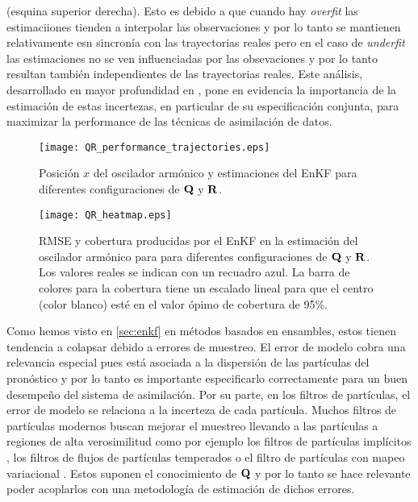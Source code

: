 (esquina superior derecha). Esto es debido a que cuando hay \textit{overfit} las estimaciiones tienden a interpolar las observaciones y por lo tanto se mantienen relativamente esn sincronía con las trayectorias reales pero en el caso de \textit{underfit} las estimaciones no se ven influenciadas por las obsevaciones y por lo tanto resultan también independientes de las trayectorias reales. Este análisis, desarrollado en mayor profundidad en \cite{Tandeo2020}, pone en evidencia la importancia de la estimación de estas incertezas, en particular de su especificación conjunta, para maximizar la performance de las técnicas de asimilación de datos.

\begin{figure}[h]
    \centering
    \texttt{[image: QR\_performance\_trajectories.eps]}
    \caption{Posición $x$ del oscilador armónico y estimaciones del EnKF para diferentes configuraciones de $\mathbf{Q}$ y $\mathbf{R}$.}
    \label{fig:QR_performance_trajectories}
\end{figure}

\begin{figure}[h]
    \centering
    \texttt{[image: QR\_heatmap.eps]}
    \caption{RMSE y cobertura producidas por el EnKF en la estimación del oscilador armónico para para diferentes configuraciones de $\mathbf{Q}$ y $\mathbf{R}$. Los valores reales se indican con un recuadro azul. La barra de colores para la cobertura tiene un escalado lineal para que el centro (color blanco) esté en el valor ópimo de cobertura de 95\%.}
    \label{fig:QR_heatmap}
\end{figure}

Como hemos visto en \ref{sec:enkf} en métodos basados en ensambles, estos tienen tendencia a colapsar debido a errores de muestreo. El error de modelo cobra una relevancia especial pues está asociada a la dispersión de las partículas del pronóstico y por lo tanto es importante especificarlo correctamente para un buen desempeño del sistema de asimilación. Por su parte, en los filtros de partículas, el error de modelo se relaciona a la incerteza de cada partícula. Muchos filtros de partículas modernos buscan mejorar el muestreo llevando a las partículas a regiones de alta verosimilitud como por ejemplo los filtros de partículas implícitos \citep{Chorin2009, Atkins2013, Zhu2016}, los filtros de flujos de partículas temperados \citep{Daum2009} o el filtro de partículas con mapeo variacional \citep{Pulido2019}. Estos suponen el conocimiento de $\mathbf{Q}$ y por lo tanto se hace relevante poder acoplarlos con una metodología de estimación de dichos errores.


